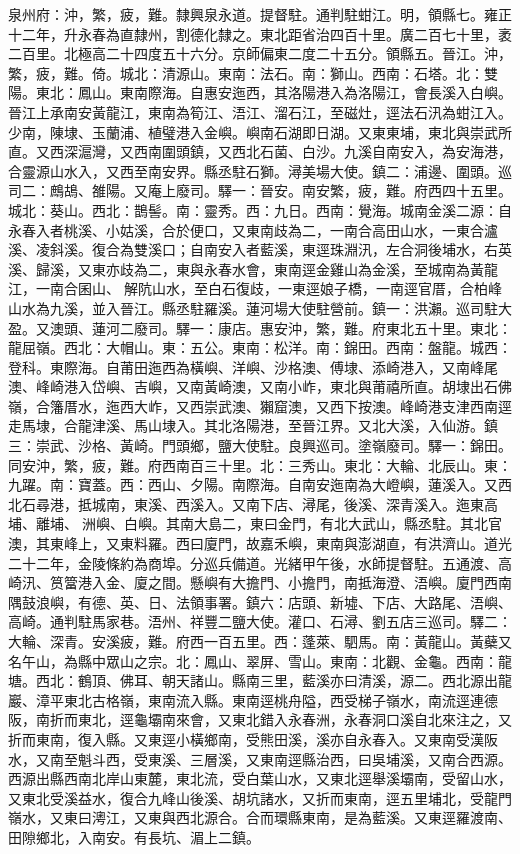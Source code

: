 \begin{pinyinscope}
泉州府：沖，繁，疲，難。隸興泉永道。提督駐。通判駐蚶江。明，領縣七。雍正十二年，升永春為直隸州，割德化隸之。東北距省治四百十里。廣二百七十里，袤二百里。北極高二十四度五十六分。京師偏東二度二十五分。領縣五。晉江。沖，繁，疲，難。倚。城北：清源山。東南：法石。南：獅山。西南：石塔。北：雙陽。東北：鳳山。東南際海。自惠安迤西，其洛陽港入為洛陽江，會長溪入白嶼。晉江上承南安黃龍江，東南為筍江、浯江、溜石江，至磁灶，逕法石汛為蚶江入。少南，陳埭、玉蘭浦、植璧港入金嶼。嶼南石湖即日湖。又東東埔，東北與崇武所直。又西深滬灣，又西南圍頭鎮，又西北石菌、白沙。九溪自南安入，為安海港，合靈源山水入，又西至南安界。縣丞駐石獅。潯美場大使。鎮二：浦邊、圍頭。巡司二：鷓鴣、雒陽。又庵上廢司。驛一：晉安。南安繁，疲，難。府西四十五里。城北：葵山。西北：鵲髻。南：靈秀。西：九日。西南：覺海。城南金溪二源：自永春入者桃溪、小姑溪，合於便口，又東南歧為二，一南合高田山水，一東合瀘溪、凌斜溪。復合為雙溪口；自南安入者藍溪，東逕珠淵汛，左合洞後埔水，右英溪、歸溪，又東亦歧為二，東與永春水會，東南逕金雞山為金溪，至城南為黃龍江，一南合囷山、解阬山水，至白石復歧，一東逕娘子橋，一南逕官厝，合柏峰山水為九溪，並入晉江。縣丞駐羅溪。蓮河場大使駐營前。鎮一：洪瀨。巡司駐大盈。又澳頭、蓮河二廢司。驛一：康店。惠安沖，繁，難。府東北五十里。東北：龍屈嶺。西北：大帽山。東：五公。東南：松洋。南：錦田。西南：盤龍。城西：登科。東際海。自莆田迤西為橫嶼、洋嶼、沙格澳、傅埭、添崎港入，又南峰尾澳、峰崎港入岱嶼、吉嶼，又南黃崎澳，又南小岞，東北與莆禧所直。胡埭出石佛嶺，合籓厝水，迤西大岞，又西崇武澳、獺窟澳，又西下按澳。峰崎港支津西南逕走馬埭，合龍津溪、馬山埭入。其北洛陽港，至晉江界。又北大溪，入仙游。鎮三：崇武、沙格、黃崎。門頭鄉，鹽大使駐。良興巡司。塗嶺廢司。驛一：錦田。同安沖，繁，疲，難。府西南百三十里。北：三秀山。東北：大輪、北辰山。東：九躍。南：寶蓋。西：西山、夕陽。南際海。自南安迤南為大嶝嶼，蓮溪入。又西北石尋港，抵城南，東溪、西溪入。又南下店、潯尾，後溪、深青溪入。迤東高埔、離埔、洲嶼、白嶼。其南大島二，東曰金門，有北大武山，縣丞駐。其北官澳，其東峰上，又東料羅。西曰廈門，故嘉禾嶼，東南與澎湖直，有洪濟山。道光二十二年，金陵條約為商埠。分巡兵備道。光緒甲午後，水師提督駐。五通渡、高崎汛、筼簹港入金、廈之間。懸嶼有大擔門、小擔門，南抵海澄、浯嶼。廈門西南隅鼓浪嶼，有德、英、日、法領事署。鎮六：店頭、新墟、下店、大路尾、浯嶼、高崎。通判駐馬家巷。浯州、祥豐二鹽大使。灌口、石潯、劉五店三巡司。驛二：大輪、深青。安溪疲，難。府西一百五里。西：蓬萊、駟馬。南：黃龍山。黃蘗又名午山，為縣中眾山之宗。北：鳳山、翠屏、雪山。東南：北觀、金龜。西南：龍塘。西北：鶴頂、佛耳、朝天諸山。縣南三里，藍溪亦曰清溪，源二。西北源出龍巖、漳平東北古格嶺，東南流入縣。東南逕桃舟隘，西受梯子嶺水，南流逕連德阪，南折而東北，逕龜壩南來會，又東北錯入永春洲，永春洞口溪自北來注之，又折而東南，復入縣。又東逕小橫鄉南，受熊田溪，溪亦自永春入。又東南受漢阪水，又南至魁斗西，受東溪、三層溪，又東南逕縣治西，曰吳埔溪，又南合西源。西源出縣西南北岸山東麓，東北流，受白葉山水，又東北逕舉溪壩南，受留山水，又東北受溪益水，復合九峰山後溪、胡坑諸水，又折而東南，逕五里埔北，受龍門嶺水，又東曰澚江，又東與西北源合。合而環縣東南，是為藍溪。又東逕羅渡南、田隙鄉北，入南安。有長坑、湄上二鎮。


\end{pinyinscope}
